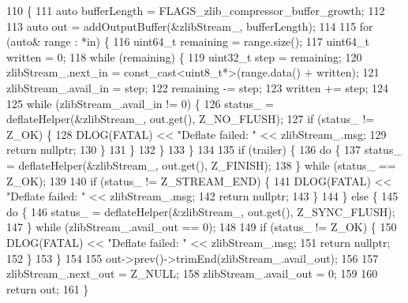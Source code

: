 \begin{DoxyCode}
110                                                                     \{
111   \textcolor{keyword}{auto} bufferLength = FLAGS\_zlib\_compressor\_buffer\_growth;
112 
113   \textcolor{keyword}{auto} out = addOutputBuffer(&zlibStream_, bufferLength);
114 
115   \textcolor{keywordflow}{for} (\textcolor{keyword}{auto}& range : *in) \{
116     uint64\_t remaining = range.size();
117     uint64\_t written = 0;
118     \textcolor{keywordflow}{while} (remaining) \{
119       uint32\_t step = remaining;
120       zlibStream_.next\_in = \textcolor{keyword}{const\_cast<}uint8\_t*\textcolor{keyword}{>}(range.data() + written);
121       zlibStream_.avail\_in = step;
122       remaining -= step;
123       written += step;
124 
125       \textcolor{keywordflow}{while} (zlibStream_.avail\_in != 0) \{
126         status_ = deflateHelper(&zlibStream_, out.get(), Z\_NO\_FLUSH);
127         \textcolor{keywordflow}{if} (status_ != Z\_OK) \{
128           DLOG(FATAL) << \textcolor{stringliteral}{"Deflate failed: "} << zlibStream_.msg;
129           \textcolor{keywordflow}{return} \textcolor{keyword}{nullptr};
130         \}
131       \}
132     \}
133   \}
134 
135   \textcolor{keywordflow}{if} (trailer) \{
136     \textcolor{keywordflow}{do} \{
137       status_ = deflateHelper(&zlibStream_, out.get(), Z\_FINISH);
138     \} \textcolor{keywordflow}{while} (status_ == Z\_OK);
139 
140     \textcolor{keywordflow}{if} (status_ != Z\_STREAM\_END) \{
141       DLOG(FATAL) << \textcolor{stringliteral}{"Deflate failed: "} << zlibStream_.msg;
142       \textcolor{keywordflow}{return} \textcolor{keyword}{nullptr};
143     \}
144   \} \textcolor{keywordflow}{else} \{
145     \textcolor{keywordflow}{do} \{
146       status_ = deflateHelper(&zlibStream_, out.get(), Z\_SYNC\_FLUSH);
147     \} \textcolor{keywordflow}{while} (zlibStream_.avail\_out == 0);
148 
149     \textcolor{keywordflow}{if} (status_ != Z\_OK) \{
150       DLOG(FATAL) << \textcolor{stringliteral}{"Deflate failed: "} << zlibStream_.msg;
151       \textcolor{keywordflow}{return} \textcolor{keyword}{nullptr};
152     \}
153   \}
154 
155   out->prev()->trimEnd(zlibStream_.avail\_out);
156 
157   zlibStream_.next\_out = Z\_NULL;
158   zlibStream_.avail\_out = 0;
159 
160   \textcolor{keywordflow}{return} out;
161 \}
\end{DoxyCode}
